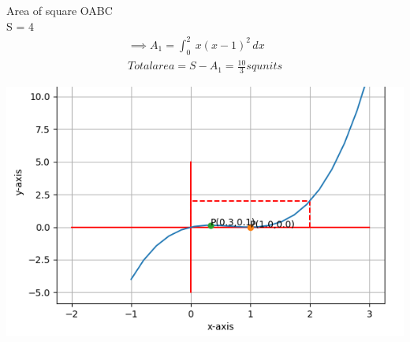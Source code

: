 \documentclass[journal,10pt,twocolumn]{article}
\begin{document}
Area of square OABC\\
S = 4
\begin{align}
\implies A_1=\int_{0}^{2} \ x(x-1)^2 \,dx\\
Total area = S - A_1 = \frac{10}{3}squnits
\end{align}

\includegraphics[width=1\columnwidth]{optt.png}
\centering {}
\end{document}
